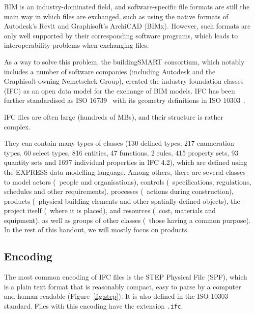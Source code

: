 BIM is an industry-dominated field, and software-specific file formats are still the main way in which files are exchanged, such as using the native formats of Autodesk's Revit and Graphisoft's ArchiCAD (BIMx).
However, such formats are only well supported by their corresponding software programs, which leads to interoperability problems when exchanging files.

As a way to solve this problem, the buildingSMART consortium, which notably includes a number of software companies (including Autodesk and the Graphisoft-owning Nemetschek Group), created the industry foundation classes (IFC) as an open data model for the exchange of BIM models.
IFC has been further standardised as ISO 16739~\citep{ISO16739:2013} with its geometry definitions in ISO 10303~\citep{ISO10303:2014}.

IFC files are often large (hundreds of MBs), and their structure is rather complex.

They can contain many types of classes (130 defined types, 217 enumeration types, 60 select types, 816 entities, 47 functions, 2 rules, 415 property sets, 93 quantity sets and 1697 individual properties in IFC 4.2), which are defined using the EXPRESS data modelling language.
Among others, there are several classes to model actors (\eg\ people and organisations), controls (\eg\ specifications, regulations, schedules and other requirements), processes (\eg\ actions during construction), products (\eg\ physical building elements and other spatially defined objects), the project itself (\eg\ where it is placed), and resources (\eg\ cost, materials and equipment), as well as groups of other classes (\eg\ those having a common purpose).
In the rest of this handout, we will mostly focus on products.

\subsection{Encoding}

The most common encoding of IFC files is the STEP Physical File (SPF), which is a plain text format that is reasonably compact, easy to parse by a computer and human readable (Figure~\ref{fig:step}).
It is also defined in the ISO 10303 standard.
Files with this encoding have the extension \texttt{.ifc}.

